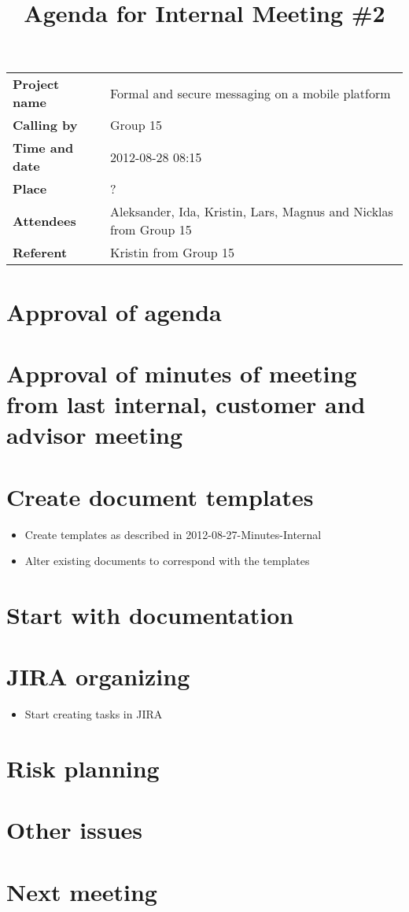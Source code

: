 \documentclass[a4paper,12pt]{article}
\begin{document}
\title{Agenda for Internal Meeting \#2}
\maketitle
\begin{tabular}{>{\bfseries}l l}	
Project name&Formal and secure messaging on a mobile platform\\
Calling by&Group 15\\
Time and date&2012-08-28 08:15\\
Place&?\\
Attendees&Aleksander, Ida, Kristin, Lars, Magnus and Nicklas from Group 15\\
Referent&Kristin from Group 15\\
\end{tabular}

\section{Approval of agenda}
\section{Approval of minutes of meeting from last internal, customer and advisor meeting}
\section{Create document templates}
\begin{itemize}
\item
Create templates as described in 2012-08-27-Minutes-Internal
\item
Alter existing documents to correspond with the templates
\end{itemize}
\section{Start with documentation}
\section{JIRA organizing}
\begin{itemize}
\item
Start creating tasks in JIRA
\end{itemize}
\section{Risk planning}
\section{Other issues}
\section{Next meeting}
\end{document}
